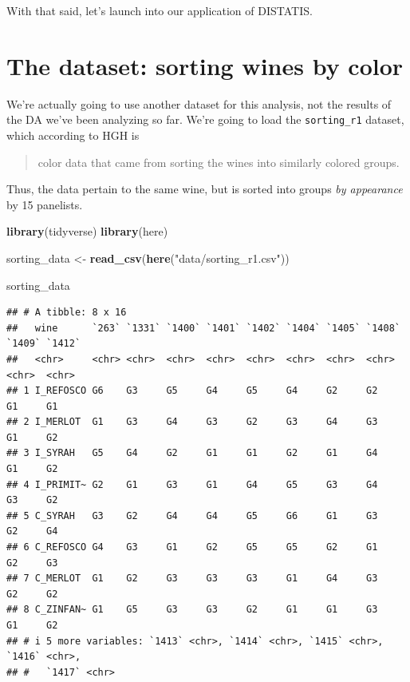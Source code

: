 \documentclass[
]{book}
\newenvironment{Shaded}{\begin{snugshade}}{\end{snugshade}}
\newcommand{\FunctionTok}[1]{\textcolor[rgb]{0.13,0.29,0.53}{\textbf{#1}}}
\newcommand{\NormalTok}[1]{#1}
\newcommand{\OtherTok}[1]{\textcolor[rgb]{0.56,0.35,0.01}{#1}}
\newcommand{\StringTok}[1]{\textcolor[rgb]{0.31,0.60,0.02}{#1}}
\begin{document}
With that said, let's launch into our application of DISTATIS.

\section{The dataset: sorting wines by color}\label{the-dataset-sorting-wines-by-color}

We're actually going to use another dataset for this analysis, not the results of the DA we've been analyzing so far. We're going to load the \texttt{sorting\_r1} dataset, which according to HGH is

\begin{quote}
color data that came from sorting the wines into similarly colored groups.
\end{quote}

Thus, the data pertain to the same wine, but is sorted into groups \emph{by appearance} by 15 panelists.

\begin{Shaded}
\begin{Highlighting}[]
\FunctionTok{library}\NormalTok{(tidyverse)}
\FunctionTok{library}\NormalTok{(here)}

\NormalTok{sorting\_data }\OtherTok{\textless{}{-}} \FunctionTok{read\_csv}\NormalTok{(}\FunctionTok{here}\NormalTok{(}\StringTok{"data/sorting\_r1.csv"}\NormalTok{))}

\NormalTok{sorting\_data}
\end{Highlighting}
\end{Shaded}

\begin{verbatim}
## # A tibble: 8 x 16
##   wine      `263` `1331` `1400` `1401` `1402` `1404` `1405` `1408` `1409` `1412`
##   <chr>     <chr> <chr>  <chr>  <chr>  <chr>  <chr>  <chr>  <chr>  <chr>  <chr> 
## 1 I_REFOSCO G6    G3     G5     G4     G5     G4     G2     G2     G1     G1    
## 2 I_MERLOT  G1    G3     G4     G3     G2     G3     G4     G3     G1     G2    
## 3 I_SYRAH   G5    G4     G2     G1     G1     G2     G1     G4     G1     G2    
## 4 I_PRIMIT~ G2    G1     G3     G1     G4     G5     G3     G4     G3     G2    
## 5 C_SYRAH   G3    G2     G4     G4     G5     G6     G1     G3     G2     G4    
## 6 C_REFOSCO G4    G3     G1     G2     G5     G5     G2     G1     G2     G3    
## 7 C_MERLOT  G1    G2     G3     G3     G3     G1     G4     G3     G2     G2    
## 8 C_ZINFAN~ G1    G5     G3     G3     G2     G1     G1     G3     G1     G2    
## # i 5 more variables: `1413` <chr>, `1414` <chr>, `1415` <chr>, `1416` <chr>,
## #   `1417` <chr>
\end{verbatim}
\end{document}
